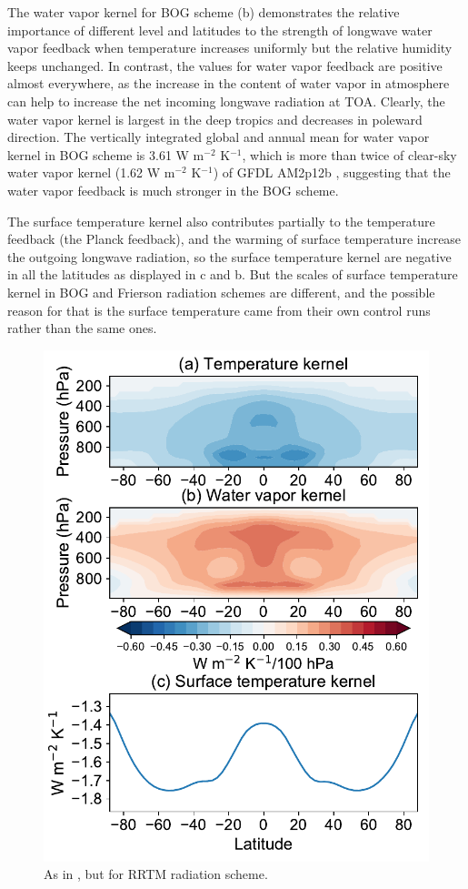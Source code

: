 The water vapor kernel for BOG scheme (b) demonstrates the relative importance of different level and latitudes to the strength of longwave water vapor feedback when temperature increases uniformly but the relative humidity keeps unchanged. In contrast, the values for water vapor feedback are positive almost everywhere, as the increase in the content of water vapor in atmosphere can help to increase the net incoming longwave radiation at TOA. Clearly, the water vapor kernel is largest in the deep tropics and decreases in poleward direction. The vertically integrated global and annual mean for water vapor kernel in BOG scheme is 3.61 W m$^{-2}$ K$^{-1}$, which is more than twice of clear-sky water vapor kernel (1.62 W m$^{-2}$ K$^{-1}$) of GFDL AM2p12b \citep{Soden2008}, suggesting that the water vapor feedback is much stronger in the BOG scheme.

The surface temperature kernel also contributes partially to the temperature feedback (the Planck feedback), and the warming of surface temperature increase the outgoing longwave radiation, so the surface temperature kernel are negative in all the latitudes as displayed in c and b. But the scales of surface temperature kernel in BOG and Frierson radiation schemes are different, and the possible reason for that is the surface temperature came from their own control runs rather than the same ones.

\begin{figure}[ht]
	\centering
	\includegraphics[width=.6\linewidth]{figs/polar_amp/kernels_rrtm}
	\caption{As in , but for RRTM radiation scheme.}
	\label{fig:rrtm_kernels}
\end{figure}

